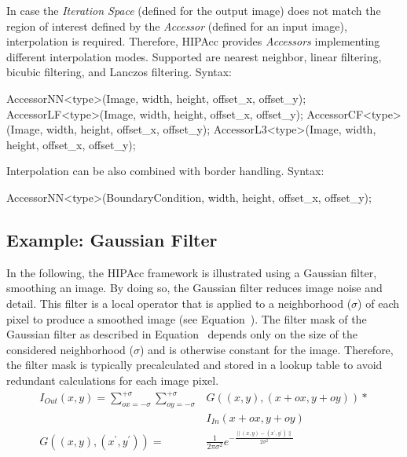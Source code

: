 \begin{itemize}
    In case the {\em Iteration Space} (defined for the output image) does not
    match the region of interest defined by the {\em Accessor} (defined for an
    input image), interpolation is required. Therefore, \ac{HIPAcc} provides
    {\em Accessors} implementing different interpolation modes. Supported are
    nearest neighbor, linear filtering, bicubic filtering, and Lanczos
    filtering. Syntax:\\
\begin{code}
AccessorNN<type>(Image, width, height, offset_x, offset_y);
AccessorLF<type>(Image, width, height, offset_x, offset_y);
AccessorCF<type>(Image, width, height, offset_x, offset_y);
AccessorL3<type>(Image, width, height, offset_x, offset_y);
\end{code}

    Interpolation can be also combined with border handling. Syntax:\\
\begin{code}
AccessorNN<type>(BoundaryCondition, width, height, offset_x, offset_y);
\end{code}
\end{itemize}


\subsection{Example: Gaussian Filter}\label{sec:gaussian_filter}
In the following, the \ac{HIPAcc} framework is illustrated using a Gaussian filter, smoothing an image. By doing so, the Gaussian filter reduces image noise and detail. This filter is a local operator that is applied to a neighborhood ($\sigma$) of each pixel to produce a smoothed image (see Equation~). The filter mask of the Gaussian filter as described in Equation~ depends only on the size of the considered neighborhood ($\sigma$) and is otherwise constant for the image. Therefore, the filter mask is typically precalculated and stored in a lookup table to avoid redundant calculations for each image pixel.
\begin{align}
    I_{Out}(x,y) = \sum_{ox=-\sigma}^{+\sigma} \sum_{oy=-\sigma}^{+\sigma} &G((x,y),(x+ox,y+oy)) *\nonumber\\
                                                                       &I_{In}(x+ox,y+oy) \label{eq:01} \\[2ex]
    G((x,y),(x^\prime,y^\prime)) = &\frac{1}{2\pi \sigma^2} e^{-\frac{\|(x,y) - (x^\prime,y^\prime)\|}{2 \sigma^2}} \label{eq:02}
\end{align}

